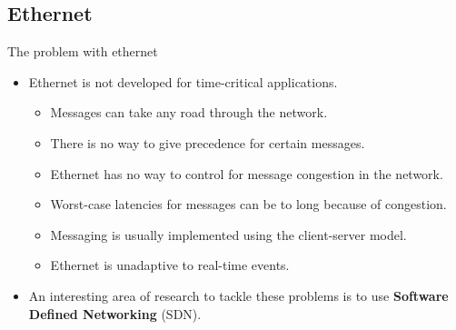 \documentclass{beamer}
\begin{document}
\subsection{Ethernet}
\begin{frame}{The problem with ethernet}
    \begin{itemize}
        \item Ethernet is not developed for time-critical applications.
            \begin{itemize}
                \item Messages can take any road through the network.
                \item There is no way to give precedence for certain messages.
                \item Ethernet has no way to control for message congestion in the network.
                \item Worst-case latencies for messages can be to long because of congestion.
                \item Messaging is usually implemented using the client-server model.
                \item Ethernet is unadaptive to real-time events.
            \end{itemize}
        \item An interesting area of research to tackle these problems is to use \textbf{Software Defined Networking }(SDN).
    \end{itemize}
\end{frame}

\end{document}

